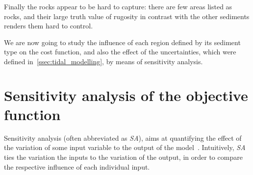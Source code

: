 \documentclass[../../Main_ManuscritThese.tex]{subfiles}
\begin{document}
Finally the rocks appear to be hard to capture: there are few areas
listed as rocks, and their large truth value of rugosity in contrast
with the other sediments renders them hard to
control.%

We are now going to study the influence of each region defined by its
sediment type on the cost function, and also the effect of the
uncertainties, which were defined in~\cref{ssec:tidal_modelling}, by
means of sensitivity analysis.



\section{Sensitivity analysis of the objective function}
\label{sec:sensitivity-analysis}
Sensitivity analysis (often abbreviated as \emph{SA}), aims at
quantifying the effect of the variation of some input variable to the
output of the model~\cite{iooss_revue_2011,janon_analyse_2012}.
Intuitively, \emph{SA} ties the variation the inputs to
the variation of the output, in order to compare the respective
influence of each individual input.
\end{document}
